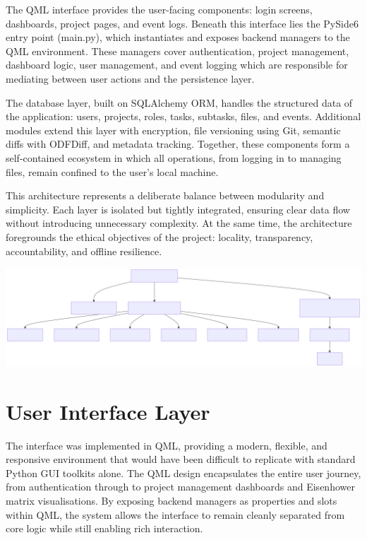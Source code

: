 \documentclass{report}
\begin{document}
The QML interface provides the user-facing components: login screens, dashboards, project pages, and event logs. 
Beneath this interface lies the PySide6 entry point (main.py), which instantiates and exposes backend managers to the QML environment. 
These managers cover authentication, project management, dashboard logic, user management, and event logging which are responsible for mediating between user actions and the persistence layer.

The database layer, built on SQLAlchemy ORM, handles the structured data of the application: users, projects, roles, tasks, subtasks, files, and events. 
Additional modules extend this layer with encryption, file versioning using Git, semantic diffs with ODFDiff, and metadata tracking. 
Together, these components form a self-contained ecosystem in which all operations, from logging in to managing files, remain confined to the user's local machine.

This architecture represents a deliberate balance between modularity and simplicity. 
Each layer is isolated but tightly integrated, ensuring clear data flow without introducing unnecessary complexity. 
At the same time, the architecture foregrounds the ethical objectives of the project: locality, transparency, accountability, and offline resilience.

\includegraphics[width=\textwidth]{png_files/main_py_architecture.png}
\section{User Interface Layer}

The interface was implemented in QML, providing a modern, flexible, and responsive environment that would have been difficult to replicate with standard Python GUI toolkits alone. 
The QML design encapsulates the entire user journey, from authentication through to project management dashboards and Eisenhower matrix visualisations. 
By exposing backend managers as properties and slots within QML, the system allows the interface to remain cleanly separated from core logic while still enabling rich interaction.
\end{document}

